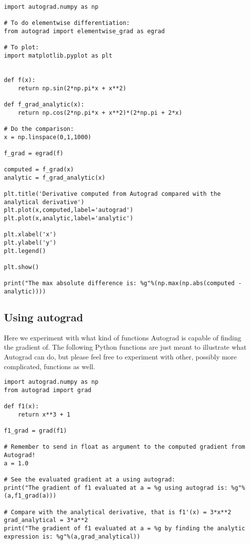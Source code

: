 \documentclass[%
oneside,                 %
final,                   %
10pt]{article}
\begin{document}
\begin{verbatim}
import autograd.numpy as np

# To do elementwise differentiation:
from autograd import elementwise_grad as egrad 

# To plot:
import matplotlib.pyplot as plt 


def f(x):
    return np.sin(2*np.pi*x + x**2)

def f_grad_analytic(x):
    return np.cos(2*np.pi*x + x**2)*(2*np.pi + 2*x)

# Do the comparison:
x = np.linspace(0,1,1000)

f_grad = egrad(f)

computed = f_grad(x)
analytic = f_grad_analytic(x)

plt.title('Derivative computed from Autograd compared with the analytical derivative')
plt.plot(x,computed,label='autograd')
plt.plot(x,analytic,label='analytic')

plt.xlabel('x')
plt.ylabel('y')
plt.legend()

plt.show()

print("The max absolute difference is: %g"%(np.max(np.abs(computed - analytic))))
\end{verbatim}

\subsection*{Using autograd}

Here we
experiment with what kind of functions Autograd is capable
of finding the gradient of. The following Python functions are just
meant to illustrate what Autograd can do, but please feel free to
experiment with other, possibly more complicated, functions as well.

\begin{verbatim}
import autograd.numpy as np
from autograd import grad

def f1(x):
    return x**3 + 1

f1_grad = grad(f1)

# Remember to send in float as argument to the computed gradient from Autograd!
a = 1.0

# See the evaluated gradient at a using autograd:
print("The gradient of f1 evaluated at a = %g using autograd is: %g"%(a,f1_grad(a)))

# Compare with the analytical derivative, that is f1'(x) = 3*x**2 
grad_analytical = 3*a**2
print("The gradient of f1 evaluated at a = %g by finding the analytic expression is: %g"%(a,grad_analytical))
\end{verbatim}
\end{document}
